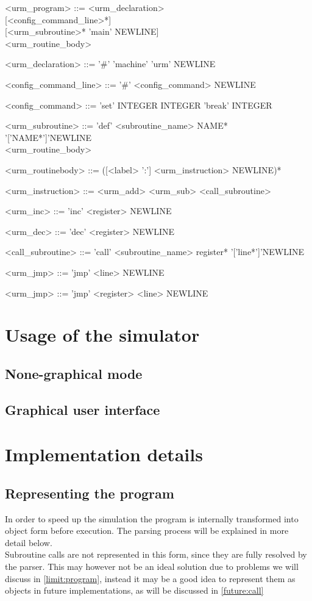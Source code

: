 \begin{definition}
\hfill
\begin{grammar}
<urm\_program> ::= <urm\_declaration>\\{}[<config\_command\_line>*]\\{}[<urm\_subroutine>* 'main' NEWLINE]\\<urm\_routine\_body>

<urm\_declaration> ::= '\#' 'machine' 'urm' NEWLINE

<config\_command\_line> ::= '\#' <config\_command> NEWLINE

<config\_command> ::= 'set' INTEGER INTEGER
                 \alt 'break' INTEGER

<urm\_subroutine> ::= 'def' <subroutine\_name> NAME* '['NAME*']'NEWLINE\\<urm\_routine\_body> 

<urm\_routinebody> ::= ([<label> ':'] <urm\_instruction> NEWLINE)*

<urm\_instruction> ::= <urm\_add>
                     \alt <urm\_sub>
                     \alt <call\_subroutine>

<urm\_inc> ::= 'inc' <register> NEWLINE

<urm\_dec> ::= 'dec' <register> NEWLINE

<call\_subroutine> ::= 'call' <subroutine\_name> register* '['line*']'NEWLINE

<urm\_jmp> ::= 'jmp' <line> NEWLINE

<urm\_jmp> ::= 'jmp' <register> <line> NEWLINE
\end{grammar}
\end{definition}



\section{Usage of the simulator}
\subsection{None-graphical mode}
\subsection{Graphical user interface}
\section{Implementation details}
\subsection{Representing the program}
In order to speed up the simulation the program is internally transformed into object form before execution. The parsing process will be explained in more detail below.\\
Subroutine calls are not represented in this form, since they are fully resolved by the parser. This may however not be an ideal solution due to problems we will discuss in \autoref{limit:program}, instead it may be a good idea to represent them as objects in future implementations, as will be discussed in \autoref{future:call}

